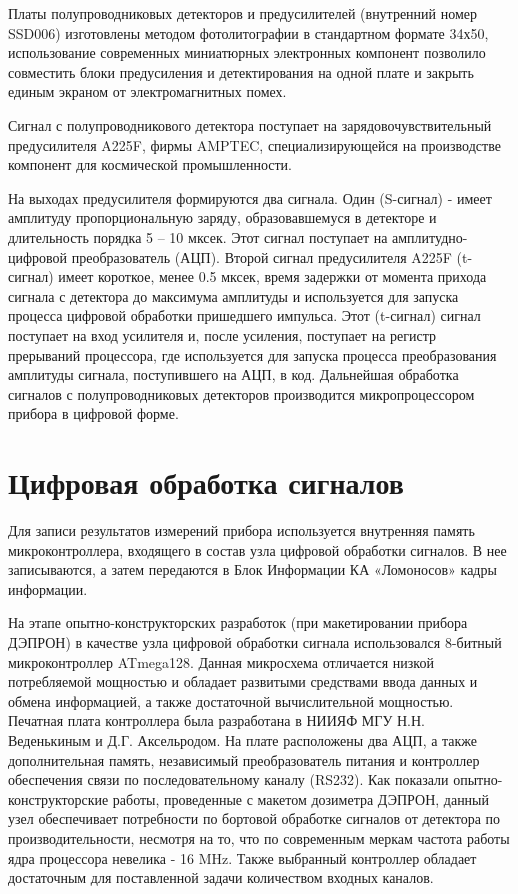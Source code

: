 Платы полупроводниковых детекторов и предусилителей (внутренний номер SSD006) изготовлены методом фотолитографии в стандартном формате 34х50, использование современных миниатюрных электронных компонент позволило совместить блоки предусиления и детектирования на одной плате и закрыть единым экраном от электромагнитных помех.

Сигнал с полупроводникового детектора поступает на зарядовочувствительный предусилителя A225F, фирмы AMPTEC, специализирующейся на производстве компонент для космической промышленности. 


На выходах предусилителя формируются два сигнала. Один (S-сигнал) - имеет амплитуду пропорциональную заряду, образовавшемуся в детекторе и длительность порядка 5 -- 10 мксек. Этот сигнал поступает на амплитудно-цифровой преобразователь (АЦП). Второй сигнал предусилителя A225F (t-сигнал) имеет короткое, менее 0.5 мксек, время задержки от момента прихода сигнала с детектора до максимума амплитуды и используется для запуска процесса цифровой обработки пришедшего импульса. Этот (t-сигнал) сигнал поступает на вход усилителя и, после усиления, поступает на регистр прерываний процессора, где используется для запуска процесса преобразования амплитуды сигнала, поступившего на АЦП, в код. Дальнейшая обработка сигналов с полупроводниковых детекторов производится микропроцессором прибора в цифровой форме.

\section{Цифровая обработка сигналов}

Для записи результатов измерений прибора используется внутренняя память микроконтроллера, входящего в состав узла цифровой обработки сигналов. В нее записываются, а затем передаются в Блок Информации КА «Ломоносов» кадры информации.

На этапе опытно-конструкторских разработок (при макетировании прибора ДЭПРОН) в качестве узла цифровой обработки сигнала использовался 8-битный микроконтроллер ATmega128. Данная микросхема отличается низкой потребляемой мощностью и обладает развитыми средствами ввода данных и обмена информацией, а также достаточной вычислительной мощностью. Печатная плата контроллера была разработана в  НИИЯФ МГУ Н.Н. Веденькиным и Д.Г. Аксельродом. На плате расположены два АЦП, а также дополнительная память, независимый преобразователь питания и контроллер обеспечения связи по последовательному каналу (RS232). Как показали опытно-конструкторские работы, проведенные с макетом дозиметра ДЭПРОН, данный узел обеспечивает потребности по бортовой обработке сигналов от детектора по производительности, несмотря на то, что по современным меркам частота работы ядра процессора невелика - 16 MHz. Также выбранный контроллер обладает достаточным для поставленной задачи количеством входных каналов.

